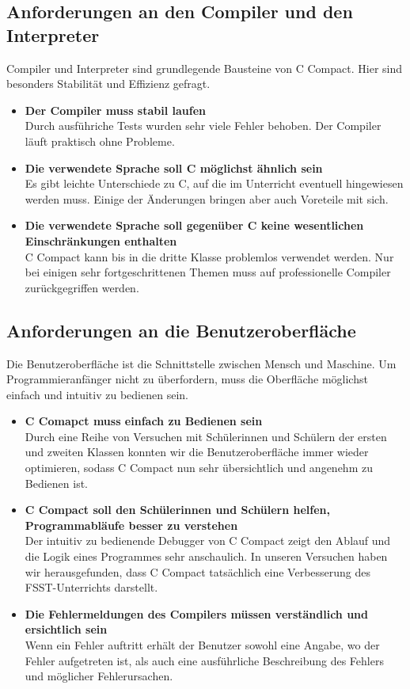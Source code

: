 \subsection*{Anforderungen an den Compiler und den Interpreter}
Compiler und Interpreter sind grundlegende Bausteine von C Compact. Hier sind besonders Stabilität und Effizienz gefragt.
\begin{itemize}
\item \textbf{Der Compiler muss stabil laufen}\\
Durch ausführiche Tests wurden sehr viele Fehler behoben. Der Compiler läuft praktisch ohne Probleme.
\item \textbf{Die verwendete Sprache soll C möglichst ähnlich sein}\\
Es gibt leichte Unterschiede zu C, auf die im Unterricht eventuell hingewiesen werden muss. Einige der Änderungen bringen aber auch Voreteile mit sich.
\item \textbf{Die verwendete Sprache soll gegenüber C keine wesentlichen Einschränkungen enthalten}\\
C Compact kann bis in die dritte Klasse problemlos verwendet werden. Nur bei einigen sehr fortgeschrittenen Themen muss auf professionelle Compiler zurückgegriffen werden.
\end{itemize}

\subsection*{Anforderungen an die Benutzeroberfläche}
Die Benutzeroberfläche ist die Schnittstelle zwischen Mensch und Maschine. Um Programmieranfänger nicht zu überfordern, muss die Oberfläche möglichst einfach und intuitiv zu bedienen sein.
\begin{itemize}
\item \textbf{C Comapct muss einfach zu Bedienen sein}\\
Durch eine Reihe von Versuchen mit Schülerinnen und Schülern der ersten und zweiten Klassen konnten wir die Benutzeroberfläche immer wieder optimieren, sodass C Compact nun sehr übersichtlich und angenehm zu Bedienen ist.
\item \textbf{C Compact soll den Schülerinnen und Schülern helfen, Programmabläufe besser zu verstehen}\\
Der intuitiv zu bedienende Debugger von C Compact zeigt den Ablauf und die Logik eines Programmes sehr anschaulich. In unseren Versuchen haben wir herausgefunden, dass C Compact tatsächlich eine Verbesserung des FSST-Unterrichts darstellt.
\item \textbf{Die Fehlermeldungen des Compilers müssen verständlich und ersichtlich sein}\\
Wenn ein Fehler auftritt erhält der Benutzer sowohl eine Angabe, wo der Fehler aufgetreten ist, als auch eine ausführliche Beschreibung des Fehlers und möglicher Fehlerursachen.
\end{itemize}

